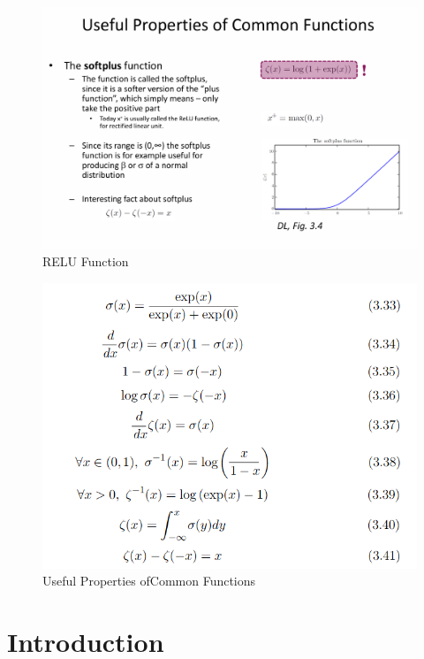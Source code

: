\documentclass[../Main.tex]{subfiles}
\begin{document}
\begin{figure}[H]
    \centering
    \includegraphics[width=1\linewidth]{Images/relu.png}
    \caption{RELU Function}
\end{figure}

\begin{figure}[H]
    \centering
    \includegraphics[width=1\linewidth]{Images/comm-useful-props.png}
    \caption{Useful Properties ofCommon Functions}
\end{figure}

\section{Introduction}
\end{document}
